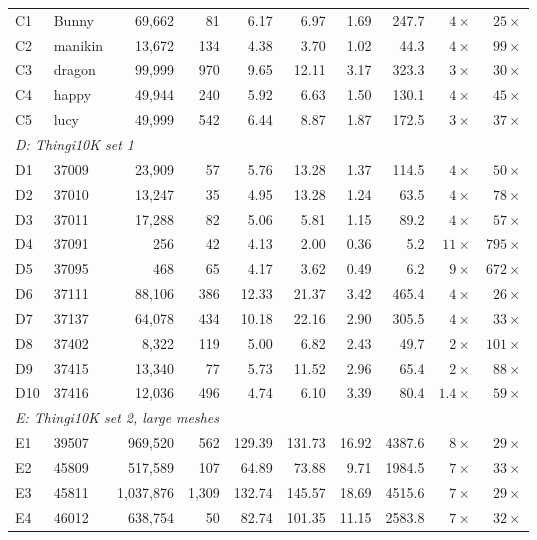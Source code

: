 \documentclass[11pt,a4paper]{article}
\begin{document}
\begin{table}[H]
{\begin{tabular}{llrrrrrrrr}
C1 & Bunny       & 69{,}662 & 81  & 6.17  & 6.97  & 1.69 & 247.7 & $4\times$  & $25\times$\\
C2 & manikin     & 13{,}672 & 134 & 4.38  & 3.70  & 1.02 & 44.3  & $4\times$  & $99\times$\\
C3 & dragon      & 99{,}999 & 970 & 9.65  & 12.11 & 3.17 & 323.3 & $3\times$  & $30\times$\\
C4 & happy       & 49{,}944 & 240 & 5.92  & 6.63  & 1.50 & 130.1 & $4\times$  & $45\times$\\
C5 & lucy        & 49{,}999 & 542 & 6.44  & 8.87  & 1.87 & 172.5 & $3\times$  & $37\times$\\
\midrule
\multicolumn{10}{l}{\textit{D: Thingi10K set 1}}\\
D1  & 37009 & 23{,}909 & 57  & 5.76  & 13.28 & 1.37 & 114.5 & $4\times$   & $50\times$\\
D2  & 37010 & 13{,}247 & 35  & 4.95  & 13.28 & 1.24 & 63.5  & $4\times$   & $78\times$\\
D3  & 37011 & 17{,}288 & 82  & 5.06  & 5.81  & 1.15 & 89.2  & $4\times$   & $57\times$\\
D4  & 37091 & 256    & 42  & 4.13  & 2.00  & 0.36 & 5.2   & $11\times$  & $795\times$\\
D5  & 37095 & 468    & 65  & 4.17  & 3.62  & 0.49 & 6.2   & $9\times$   & $672\times$\\
D6  & 37111 & 88{,}106 & 386 & 12.33 & 21.37 & 3.42 & 465.4 & $4\times$   & $26\times$\\
D7  & 37137 & 64{,}078 & 434 & 10.18 & 22.16 & 2.90 & 305.5 & $4\times$   & $33\times$\\
D8  & 37402 & 8{,}322  & 119 & 5.00  & 6.82  & 2.43 & 49.7  & $2\times$   & $101\times$\\
D9  & 37415 & 13{,}340 & 77  & 5.73  & 11.52 & 2.96 & 65.4  & $2\times$   & $88\times$\\
D10 & 37416 & 12{,}036 & 496 & 4.74  & 6.10  & 3.39 & 80.4  & $1.4\times$ & $59\times$\\
\midrule
\multicolumn{10}{l}{\textit{E: Thingi10K set 2, large meshes}}\\
E1  & 39507 & 969{,}520   & 562   & 129.39 & 131.73 & 16.92 & 4387.6 & $8\times$   & $29\times$\\
E2  & 45809 & 517{,}589   & 107   & 64.89  & 73.88  & 9.71  & 1984.5 & $7\times$   & $33\times$\\
E3  & 45811 & 1{,}037{,}876 & 1{,}309 & 132.74 & 145.57 & 18.69 & 4515.6 & $7\times$   & $29\times$\\
E4  & 46012 & 638{,}754   & 50    & 82.74  & 101.35 & 11.15 & 2583.8 & $7\times$   & $32\times$\\

\end{tabular}}
\end{table}
\end{document}
